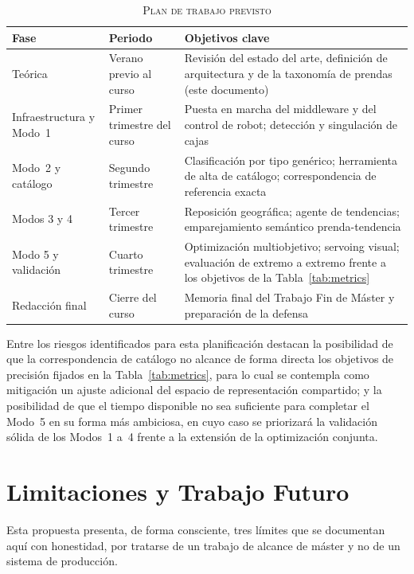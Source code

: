 \documentclass[conference]{IEEEtran}
\begin{document}
\begin{table}[!t]
\caption{\textsc{Plan de trabajo previsto}}
\label{tab:plan}
\centering
\footnotesize
\begin{tabular}{@{}lp{3.6cm}p{9.5cm}@{}}
\toprule
\textbf{Fase} & \textbf{Periodo} & \textbf{Objetivos clave} \\
\midrule
Teórica & Verano previo al curso & Revisión del estado del arte, definición de arquitectura y de la taxonomía de prendas (este documento) \\
Infraestructura y Modo~1 & Primer trimestre del curso & Puesta en marcha del middleware y del control de robot; detección y singulación de cajas \\
Modo~2 y catálogo & Segundo trimestre & Clasificación por tipo genérico; herramienta de alta de catálogo; correspondencia de referencia exacta \\
Modos 3 y 4 & Tercer trimestre & Reposición geográfica; agente de tendencias; emparejamiento semántico prenda-tendencia \\
Modo 5 y validación & Cuarto trimestre & Optimización multiobjetivo; servoing visual; evaluación de extremo a extremo frente a los objetivos de la Tabla~\ref{tab:metrics} \\
Redacción final & Cierre del curso & Memoria final del Trabajo Fin de Máster y preparación de la defensa \\
\bottomrule
\end{tabular}
\end{table}

Entre los riesgos identificados para esta planificación destacan la
posibilidad de que la correspondencia de catálogo no alcance de forma
directa los objetivos de precisión fijados en la Tabla~\ref{tab:metrics},
para lo cual se contempla como mitigación un ajuste adicional del espacio de
representación compartido; y la posibilidad de que el tiempo disponible no
sea suficiente para completar el Modo~5 en su forma más ambiciosa, en cuyo
caso se priorizará la validación sólida de los Modos~1 a~4 frente a la
extensión de la optimización conjunta.

\section{Limitaciones y Trabajo Futuro}
\label{sec:future}

Esta propuesta presenta, de forma consciente, tres límites que se documentan
aquí con honestidad, por tratarse de un trabajo de alcance de máster y no de
un sistema de producción.
\end{document}
